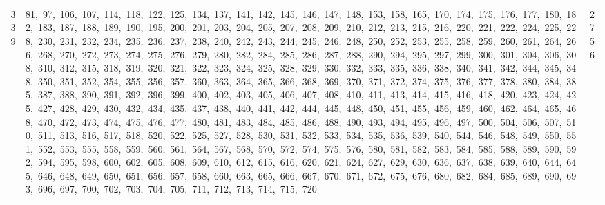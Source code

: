 \begin{longtable}{c|p{}|r}
339 & 81,\ 97,\ 106,\ 107,\ 114,\ 118,\ 122,\ 125,\ 134,\ 137,\ 141,\ 142,\ 145,\ 146,\ 147,\ 148,\ 153,\ 158,\ 165,\ 170,\ 174,\ 175,\ 176,\ 177,\ 180,\ 182,\ 183,\ 187,\ 188,\ 189,\ 190,\ 195,\ 200,\ 201,\ 203,\ 204,\ 205,\ 207,\ 208,\ 209,\ 210,\ 212,\ 213,\ 215,\ 216,\ 220,\ 221,\ 222,\ 224,\ 225,\ 228,\ 230,\ 231,\ 232,\ 234,\ 235,\ 236,\ 237,\ 238,\ 240,\ 242,\ 243,\ 244,\ 245,\ 246,\ 248,\ 250,\ 252,\ 253,\ 255,\ 258,\ 259,\ 260,\ 261,\ 264,\ 266,\ 268,\ 270,\ 272,\ 273,\ 274,\ 275,\ 276,\ 279,\ 280,\ 282,\ 284,\ 285,\ 286,\ 287,\ 288,\ 290,\ 294,\ 295,\ 297,\ 299,\ 300,\ 301,\ 304,\ 306,\ 308,\ 310,\ 312,\ 315,\ 318,\ 319,\ 320,\ 321,\ 322,\ 323,\ 324,\ 325,\ 328,\ 329,\ 330,\ 332,\ 333,\ 335,\ 336,\ 338,\ 340,\ 341,\ 342,\ 344,\ 345,\ 348,\ 350,\ 351,\ 352,\ 354,\ 355,\ 356,\ 357,\ 360,\ 363,\ 364,\ 365,\ 366,\ 368,\ 369,\ 370,\ 371,\ 372,\ 374,\ 375,\ 376,\ 377,\ 378,\ 380,\ 384,\ 385,\ 387,\ 388,\ 390,\ 391,\ 392,\ 396,\ 399,\ 400,\ 402,\ 403,\ 405,\ 406,\ 407,\ 408,\ 410,\ 411,\ 413,\ 414,\ 415,\ 416,\ 418,\ 420,\ 423,\ 424,\ 425,\ 427,\ 428,\ 429,\ 430,\ 432,\ 434,\ 435,\ 437,\ 438,\ 440,\ 441,\ 442,\ 444,\ 445,\ 448,\ 450,\ 451,\ 455,\ 456,\ 459,\ 460,\ 462,\ 464,\ 465,\ 468,\ 470,\ 472,\ 473,\ 474,\ 475,\ 476,\ 477,\ 480,\ 481,\ 483,\ 484,\ 485,\ 486,\ 488,\ 490,\ 493,\ 494,\ 495,\ 496,\ 497,\ 500,\ 504,\ 506,\ 507,\ 510,\ 511,\ 513,\ 516,\ 517,\ 518,\ 520,\ 522,\ 525,\ 527,\ 528,\ 530,\ 531,\ 532,\ 533,\ 534,\ 535,\ 536,\ 539,\ 540,\ 544,\ 546,\ 548,\ 549,\ 550,\ 551,\ 552,\ 553,\ 555,\ 558,\ 559,\ 560,\ 561,\ 564,\ 567,\ 568,\ 570,\ 572,\ 574,\ 575,\ 576,\ 580,\ 581,\ 582,\ 583,\ 584,\ 585,\ 588,\ 589,\ 590,\ 592,\ 594,\ 595,\ 598,\ 600,\ 602,\ 605,\ 608,\ 609,\ 610,\ 612,\ 615,\ 616,\ 620,\ 621,\ 624,\ 627,\ 629,\ 630,\ 636,\ 637,\ 638,\ 639,\ 640,\ 644,\ 645,\ 646,\ 648,\ 649,\ 650,\ 651,\ 656,\ 657,\ 658,\ 660,\ 663,\ 665,\ 666,\ 667,\ 670,\ 671,\ 672,\ 675,\ 676,\ 680,\ 682,\ 684,\ 685,\ 689,\ 690,\ 693,\ 696,\ 697,\ 700,\ 702,\ 703,\ 704,\ 705,\ 711,\ 712,\ 713,\ 714,\ 715,\ 720 & 2756 \\

\end{longtable}
